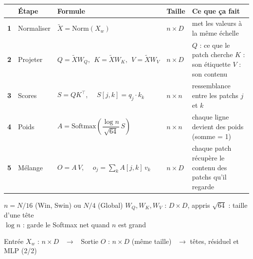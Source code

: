 \documentclass[border=10pt,varwidth=700pt]{standalone}
\newcommand{\num}[1]{\textbf{#1}}
\begin{document}
\fontsize{13}{16}\selectfont
\begin{tabular}{>{\centering\arraybackslash}m{22pt} >{\raggedright\arraybackslash}m{95pt} >{\raggedright\arraybackslash}m{215pt} >{\centering\arraybackslash}m{62pt} >{\raggedright\arraybackslash}m{250pt}}
\rowcolor{creme}
 & \textbf{Étape} & \textbf{Formule} & \textbf{Taille} & \textbf{Ce que ça fait} \\
\hline
\num{1} & Normaliser & $\tilde{X} = \mathrm{Norm}(X_w)$ & $n \times D$ & met les valeurs à la même échelle \\
\hline
\num{2} & Projeter & $Q = \tilde{X} W_Q,\ \ K = \tilde{X} W_K,\ \ V = \tilde{X} W_V$ & $n \times D$ & $Q$ : ce que le patch cherche \newline $K$ : son étiquette \quad $V$ : son contenu \\
\hline
\num{3} & Scores & $S = Q K^{\top}$, \ \ $S[j,k] = q_j \cdot k_k$ & $n \times n$ & ressemblance entre les patchs $j$ et $k$ \\
\hline
\num{4} & Poids & $A = \mathrm{Softmax}\!\left(\dfrac{\log n}{\sqrt{64}}\, S\right)$ & $n \times n$ & chaque ligne devient des poids (somme = 1) \\
\hline
\num{5} & Mélange & $O = A\, V$, \ \ $o_j = \sum_k A[j,k]\, v_k$ & $n \times D$ & chaque patch récupère le contenu des patchs \newline qu'il regarde \\
\hline
\end{tabular}

\vspace{10pt}
\begin{minipage}{660pt}
\fontsize{12}{15}\selectfont
$n = N/16$ (Win, Swin) ou $N/4$ (Global) \qquad $W_Q, W_K, W_V$ : $D \times D$, appris \qquad $\sqrt{64}$ : taille d'une tête \\ $\log n$ : garde le Softmax net quand $n$ est grand

\vspace{4pt}
Entrée $X_w$ : $n \times D$ \ $\rightarrow$ \ Sortie $O$ : $n \times D$ (même taille) \ $\rightarrow$ têtes, résiduel et MLP (2/2)
\end{minipage}
\end{document}
